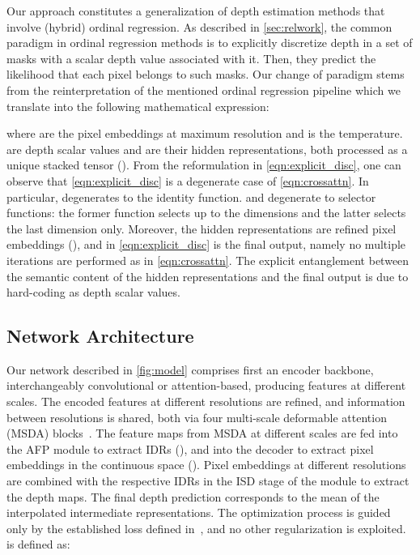 Our approach constitutes a generalization of depth estimation methods that involve (hybrid) ordinal regression. As described in \cref{sec:relwork}, the common paradigm in ordinal regression methods is to explicitly discretize depth in a set of masks with a scalar depth value associated with it. Then, they predict the likelihood that each pixel belongs to such masks. Our change of paradigm stems from the reinterpretation of the mentioned ordinal regression pipeline which we translate into the following mathematical expression:

where  are the pixel embeddings at maximum resolution and  is the  temperature.  are  depth scalar values and  are their hidden representations, both processed as a unique stacked tensor (). From the reformulation in \eqref{eqn:explicit_disc}, one can observe that \eqref{eqn:explicit_disc} is a degenerate case of \eqref{eqn:crossattn}. In particular,  degenerates to the identity function.  and  degenerate to selector functions: the former function selects up to the  dimensions and the latter selects the last dimension only. Moreover, the hidden representations are refined pixel embeddings (), and  in \eqref{eqn:explicit_disc} is the final output, namely no multiple iterations are performed as in \eqref{eqn:crossattn}. The explicit entanglement between the semantic content of the hidden representations and the final output is due to hard-coding  as depth scalar values.


\subsection{Network Architecture}
\label{sec:method_arch}
Our network described in \cref{fig:model} comprises first an encoder backbone, interchangeably convolutional or attention-based, producing features at different scales. The encoded features at different resolutions are refined, and information between resolutions is shared, both via four multi-scale deformable attention (MSDA) blocks~\cite{Zhu2021DefDETR}. The feature maps from MSDA at different scales are fed into the AFP module to extract IDRs (), and into the decoder to extract pixel embeddings in the continuous space (). Pixel embeddings at different resolutions are combined with the respective IDRs in the ISD stage of the \ourmodule module to extract the depth maps. The final depth prediction corresponds to the mean of the interpolated intermediate representations. 
The optimization process is guided only by the established  loss defined in~\cite{Eigen2014}, and no other regularization is exploited.  is defined as:

